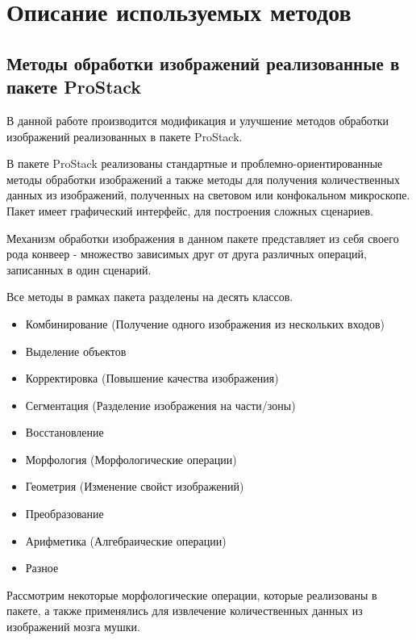 \chapter{Описание используемых методов} \label{ch2}
	


\section{Методы обработки изображений реализованные в пакете ProStack} \label{ch2:title-abbr} %
В данной работе производится модификация и улучшение методов обработки изображений реализованных в пакете ProStack.

В пакете ProStack реализованы стандартные и проблемно-ориентированные методы
обработки изображений а также методы для получения количественных данных из изображений, полученных на световом или конфокальном микроскопе. Пакет имеет графический
интерфейс, для построения сложных сценариев. 

Механизм обработки изображения в данном пакете представляет из себя
своего рода конвеер - множество зависимых
друг от друга различных операций, записанных в один сценарий.

Все методы в рамках пакета разделены на десять классов.
\begin{itemize}
	\item Комбинирование (Получение одного изображения из нескольких входов)
	\item Выделение объектов
	\item Корректировка (Повышение качества изображения)
	\item Сегментация (Разделение изображения на части/зоны)
	\item Восстановление
	\item Морфология (Морфологические операции)
	\item Геометрия (Изменение свойст изображений)
	\item Преобразование
	\item Арифметика (Алгебраические операции)
	\item Разное
\end{itemize}

Рассмотрим некоторые морфологические операции, которые реализованы в пакете, а также применялись для извлечение количественных данных из изображений мозга мушки.

